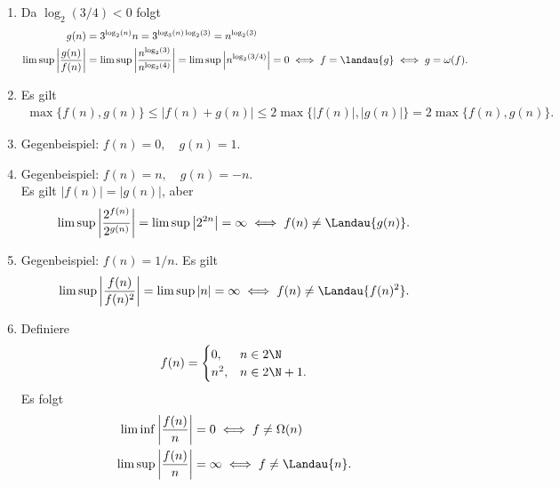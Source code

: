 \begin{solution}
\begin{enumerate}[label = (\alph*)]
  \item
  Da $\log_2(3/4) < 0$ folgt
  \begin{align*}
    g(n) &= 3^{\log_2(n)}n = 3^{\log_3(n)\log_2(3)} = n^{\log_2(3)} \\
    \limsup \left|\frac{g(n)}{f(n)}\right| &= \limsup \left|\frac{n^{\log_2(3)}}{n^{\log_2(4)}}\right|
    = \limsup \left|n^{\log_2(3/4)}\right| = 0 \iff f = \landau{g} \iff g = \omega(f).
  \end{align*}
  \item Es gilt
  \begin{align*}
    \max\{f(n), g(n)\} \leq |f(n) + g(n)| \leq 2\max\{|f(n)|,|g(n)|\} = 2\max\{f(n),g(n)\}.
  \end{align*}
  \item Gegenbeispiel: $f(n) = 0, \quad g(n) = 1$.
  \item Gegenbeispiel: $f(n) = n, \quad g(n) = -n$. \\
  Es gilt $|f(n)| = |g(n)|$, aber
  \begin{align*}
    \limsup \left|\frac{2^{f(n)}}{2^{g(n)}}\right| = \limsup \left|2^{2n}\right| = \infty \iff f(n) \neq \Landau{g(n)}.
  \end{align*}
  \item Gegenbeispiel: $f(n) = 1/n$. Es gilt
  \begin{align*}
    \limsup \left|\frac{f(n)}{f(n)^2}\right| = \limsup \left|n\right| = \infty \iff f(n) \neq \Landau{f(n)^2}.
  \end{align*}
  \item Definiere
  \begin{align*}
    f(n) = \begin{cases}
      0, & n \in 2\N \\
      n^2, & n \in 2\N + 1.
    \end{cases}
  \end{align*}
  Es folgt
  \begin{align*}
    \liminf \left|\frac{f(n)}{n}\right| &= 0 \iff f \neq \Omega(n) \\
    \limsup \left|\frac{f(n)}{n}\right| &= \infty \iff f \neq \Landau{n}.
  \end{align*}
\end{enumerate}

\end{solution}

